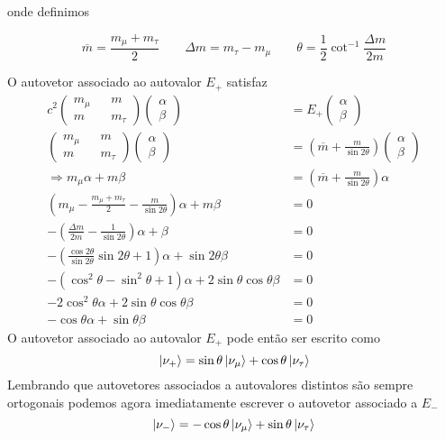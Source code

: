 \documentclass[a4paper, 12pt, notitlepage]{article}
\begin{document}
\begin{enumerate}
\begin{enumerate}[(A)]
  \noindent onde definimos

  \[ \overline{m} = \frac{m_\mu + m_\tau}{2} \qquad \Delta m = m_\tau - m_\mu \qquad \theta = \frac{1}{2} \cot^{-1} \frac{\Delta m}{2m} \]
  
  O autovetor associado ao autovalor $E_+$ satisfaz
  \begin{align*}
    c^2 \begin{pmatrix} m_\mu && m \\ m && m_\tau \end{pmatrix} \begin{pmatrix} \alpha \\ \beta \end{pmatrix} &= E_+ \begin{pmatrix} \alpha \\ \beta \end{pmatrix} \\
    \begin{pmatrix} m_\mu && m \\ m && m_\tau \end{pmatrix} \begin{pmatrix} \alpha \\ \beta \end{pmatrix} &= \left(\overline{m} + \frac{m}{\sin 2\theta}\right) \begin{pmatrix} \alpha \\ \beta \end{pmatrix} \\
    \Rightarrow m_\mu \alpha + m \beta &= \left(\overline{m} + \frac{m}{\sin 2\theta}\right) \alpha \\
   \left( m_\mu - \frac{m_\mu + m_\tau}{2} - \frac{m}{\sin 2\theta} \right) \alpha + m\beta &= 0 \\
   -\left(\frac{\Delta m}{2m} - \frac{1}{\sin 2\theta} \right) \alpha + \beta &= 0 \\
   -\left(\frac{\cos 2\theta}{\sin 2\theta} \sin 2\theta + 1\right) \alpha + \sin 2\theta \beta &= 0 \\
   -\left(\cos^2 \theta - \sin^2 \theta + 1\right) \alpha + 2 \sin \theta \cos \theta \beta &= 0 \\
   -2\cos^2 \theta \alpha + 2\sin\theta \cos \theta \beta &= 0 \\
   -\cos \theta \alpha + \sin\theta \beta &= 0
  \end{align*}
  O autovetor associado ao autovalor $E_+$ pode então ser escrito como
  \[ \ket{\nu_+} = \sin \theta \ket{\nu_\mu} + \cos \theta \ket{\nu_\tau} \]
  Lembrando que autovetores associados a autovalores distintos são sempre ortogonais podemos agora imediatamente escrever o autovetor associado a $E_-$
  \[ \ket{\nu_-} = -\cos \theta \ket{\nu_\mu} + \sin \theta \ket{\nu_\tau} \]
  

\end{enumerate}
\end{enumerate}
\end{document}

